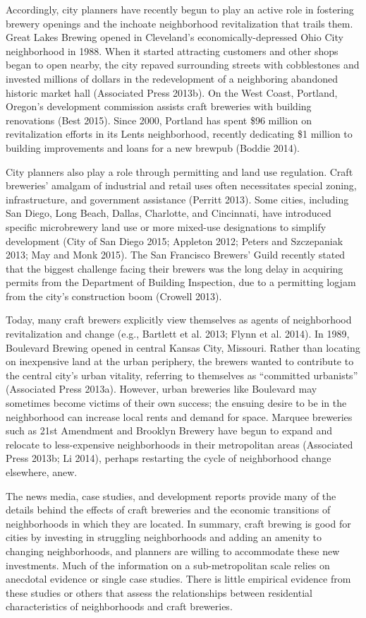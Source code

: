 \documentclass[]{article}
\begin{document}
Accordingly, city planners have recently begun to play an active role in
fostering brewery openings and the inchoate neighborhood revitalization
that trails them. Great Lakes Brewing opened in Cleveland's
economically-depressed Ohio City neighborhood in 1988. When it started
attracting customers and other shops began to open nearby, the city
repaved surrounding streets with cobblestones and invested millions of
dollars in the redevelopment of a neighboring abandoned historic market
hall (Associated Press 2013b). On the West Coast, Portland, Oregon's
development commission assists craft breweries with building renovations
(Best 2015). Since 2000, Portland has spent \$96 million on
revitalization efforts in its Lents neighborhood, recently dedicating
\$1 million to building improvements and loans for a new brewpub (Boddie
2014).

City planners also play a role through permitting and land use
regulation. Craft breweries' amalgam of industrial and retail uses often
necessitates special zoning, infrastructure, and government assistance
(Perritt 2013). Some cities, including San Diego, Long Beach, Dallas,
Charlotte, and Cincinnati, have introduced specific microbrewery land
use or more mixed-use designations to simplify development (City of San
Diego 2015; Appleton 2012; Peters and Szczepaniak 2013; May and Monk
2015). The San Francisco Brewers' Guild recently stated that the biggest
challenge facing their brewers was the long delay in acquiring permits
from the Department of Building Inspection, due to a permitting logjam
from the city's construction boom (Crowell 2013).

Today, many craft brewers explicitly view themselves as agents of
neighborhood revitalization and change (e.g., Bartlett et al. 2013;
Flynn et al. 2014). In 1989, Boulevard Brewing opened in central Kansas
City, Missouri. Rather than locating on inexpensive land at the urban
periphery, the brewers wanted to contribute to the central city's urban
vitality, referring to themselves as ``committed urbanists'' (Associated
Press 2013a). However, urban breweries like Boulevard may sometimes
become victims of their own success; the ensuing desire to be in the
neighborhood can increase local rents and demand for space. Marquee
breweries such as 21st Amendment and Brooklyn Brewery have begun to
expand and relocate to less-expensive neighborhoods in their
metropolitan areas (Associated Press 2013b; Li 2014), perhaps restarting
the cycle of neighborhood change elsewhere, anew.

The news media, case studies, and development reports provide many of
the details behind the effects of craft breweries and the economic
transitions of neighborhoods in which they are located. In summary,
craft brewing is good for cities by investing in struggling
neighborhoods and adding an amenity to changing neighborhoods, and
planners are willing to accommodate these new investments. Much of the
information on a sub-metropolitan scale relies on anecdotal evidence or
single case studies. There is little empirical evidence from these
studies or others that assess the relationships between residential
characteristics of neighborhoods and craft breweries.
\end{document}
